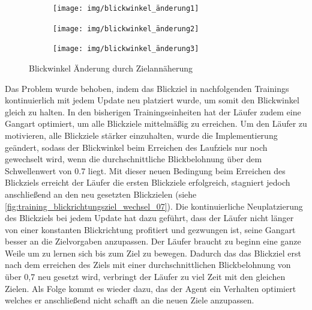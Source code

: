 \begin{figure}[H]
  \centering  
    \begin{subfigure}{.3\textwidth}
      \centering  
      \texttt{[image: img/blickwinkel\_änderung1]}
    \end{subfigure}
    \begin{subfigure}{.3\textwidth}
      \centering  
      \texttt{[image: img/blickwinkel\_änderung2]}
    \end{subfigure}
    \begin{subfigure}{.3\textwidth}
      \centering  
      \texttt{[image: img/blickwinkel\_änderung3]}
    \end{subfigure}
  \caption{Blickwinkel Änderung durch Zielannäherung}
  \label{fig:blickwinkel_änderung}
\end{figure}

Das Problem wurde behoben, indem das Blickziel in nachfolgenden Trainings kontinuierlich mit jedem Update neu platziert wurde, um somit den Blickwinkel gleich zu halten. In den bisherigen Trainingseinheiten hat der Läufer zudem eine Gangart optimiert, um alle Blickziele mittelmäßig zu erreichen. Um den Läufer zu motivieren, alle Blickziele stärker einzuhalten, wurde die Implementierung geändert, sodass der Blickwinkel beim Erreichen des Laufziels nur noch gewechselt wird, wenn die durchschnittliche Blickbelohnung über dem Schwellenwert von 0.7 liegt. Mit dieser neuen Bedingung beim Erreichen des Blickziels erreicht der Läufer die ersten Blickziele erfolgreich, stagniert jedoch anschließend an den neu gesetzten Blickzielen (siehe \ref{fig:training_blickrichtungsziel_wechsel_07}). Die kontinuierliche Neuplatzierung des Blickziels bei jedem Update hat dazu geführt, dass der Läufer nicht länger von einer konstanten Blickrichtung profitiert und gezwungen ist, seine Gangart besser an die Zielvorgaben anzupassen. Der Läufer braucht zu beginn eine ganze Weile um zu lernen sich bis zum Ziel zu bewegen. Dadurch das das Blickziel erst nach dem erreichen des Ziels mit einer durchschnittlichen Blickbelohnung von über 0,7 neu gesetzt wird, verbringt der Läufer zu viel Zeit mit den gleichen Zielen. Als Folge kommt es wieder dazu, das der Agent ein Verhalten optimiert welches er anschließend nicht schafft an die neuen Ziele anzupassen.

